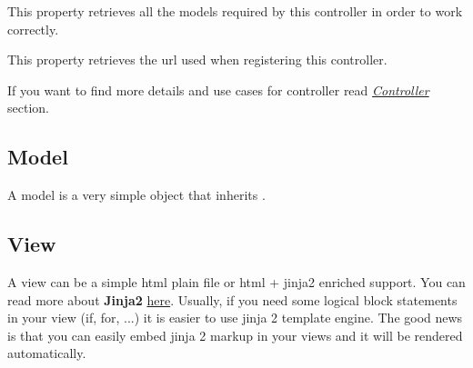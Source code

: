 \documentclass[letterpaper,10pt,english]{sphinxmanual}
\begin{document}
\begin{fulllineitems}
\begin{fulllineitems}
\end{fulllineitems}


\begin{fulllineitems}
\label{features/mvc:fantastico.mvc.controller_decorators.Controller.models}
This property retrieves all the models required by this controller in order to work correctly.

\end{fulllineitems}


\begin{fulllineitems}
\label{features/mvc:fantastico.mvc.controller_decorators.Controller.url}
This property retrieves the url used when registering this controller.

\end{fulllineitems}


\end{fulllineitems}


If you want to find more details and use cases for controller read {\hyperref[features/mvc:core-controller-section]{\emph{Controller}}} section.


\subsection{Model}
\label{features/mvc:model}
A model is a very simple object that inherits .


\subsection{View}
\label{features/mvc:view}
A view can be a simple html plain file or html + jinja2 enriched support. You can read more about \textbf{Jinja2}
\href{http://jinja.pocoo.org/docs/}{here}. Usually, if you need some logical block statements in your view (if, for, ...)
it is easier to use jinja 2 template engine. The good news is that you can easily embed jinja 2 markup in your views
and it will be rendered automatically.
\end{document}
